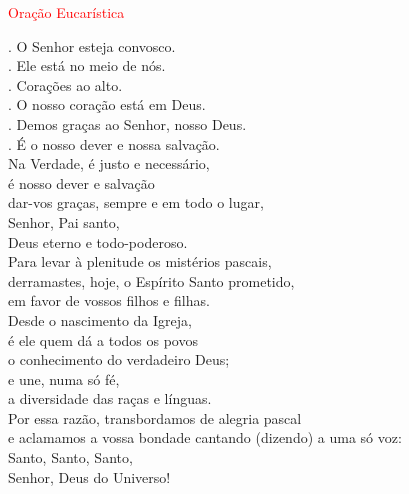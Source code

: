 \documentclass{book}
\begin{document}
\newpage

\begin{center}

    \textcolor{red}{Oração Eucarística}

\end{center}

\begin{flushleft}
    {\color{red} \Vbar.} O Senhor esteja convosco. \\
    {\color{red} \Rbar.} Ele está no meio de nós. \\
    {\color{red} \Vbar.} Corações ao alto. \\
    {\color{red} \Rbar.} O nosso coração está em Deus. \\
    {\color{red} \Vbar.} Demos graças ao Senhor, nosso Deus. \\
    {\color{red} \Rbar.} É o nosso dever e nossa salvação.
    \vspace{.1cm} \\
    Na Verdade, é justo e necessário, \\
    é nosso dever e salvação \\
    dar-vos graças, sempre e em todo o lugar, \\
    Senhor, Pai santo, \\
    Deus eterno e todo-poderoso.
    \vspace{.1cm} \\
    Para levar à plenitude os mistérios pascais, \\
    derramastes, hoje, o Espírito Santo prometido, \\
    em favor de vossos filhos e filhas.
    \vspace{.1cm} \\
    Desde o nascimento da Igreja, \\
    é ele quem dá a todos os povos \\
    o conhecimento do verdadeiro Deus; \\
    e une, numa só fé, \\
    a diversidade das raças e línguas.
    \vspace{.1cm} \\
    Por essa razão, transbordamos de alegria pascal \\
    e aclamamos a vossa bondade cantando {\color{red}(}dizendo{\color{red})} a uma só voz:
    \vspace{.1cm} \\
    Santo, Santo, Santo, \\
    Senhor, Deus do Universo! \\

\end{flushleft}
\end{document}
